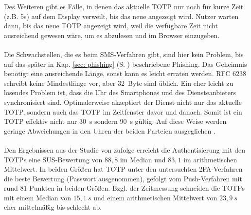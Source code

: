 Des Weiteren gibt es Fälle, in denen das aktuelle TOTP nur noch für kurze Zeit (z.B. 5s) auf dem Display 
verweilt, bis das neue angezeigt wird. Nutzer warten dann, bis das neue TOTP 
angezeigt wird, weil die verfügbare Zeit nicht ausreichend gewesen wäre, um es 
abzulesen und im Browser einzugeben.
\\\\
Die Schwachstellen, die es beim SMS-Verfahren gibt, sind hier kein Problem, bis auf 
das später in Kap. \ref{sec: phishing} (S. \pageref{sec: phishing}) beschriebene Phishing. Das Geheimnis benötigt eine ausreichende 
Länge, sonst kann es leicht erraten werden. RFC 6238 schreibt keine Mindestlänge 
vor, aber 32~Byte sind üblich. Ein eher leicht zu lösendes Problem ist, dass die Uhr 
des Smartphones und des Diensteanbieters synchronisiert sind. Optimalerweise akzeptiert der Dienst nicht nur das aktuelle TOTP, sondern auch das TOTP im Zeitfenster davor und danach. Somit ist ein TOTP effektiv nicht nur 30~s sondern 90~s gültig. Auf diese Weise werden geringe Abweichungen in den Uhren der beiden Parteien ausgeglichen \autocite[7]{rfc6238}.
\\\\
Den Ergebnissen aus der Studie von \textcite{Reese} zufolge erreicht die 
Authentisierung mit den TOTPs eine SUS-Bewertung von $88{,}8$ im Median und $83{,}1$ im 
arithmetischen Mittelwert. In beiden Größen hat TOTP unter den 
untersuchten 2FA-Verfahren die beste Bewertung (Passwort ausgenommen), gefolgt vom 
Push-Verfahren mit rund 81 Punkten in beiden Größen. Bzgl. der Zeitmessung schneiden 
die TOTPs mit einem Median von $15{,}1~s$ und einem arithmetischen Mittelwert von $23{,}9~s$ 
eher mittelmäßig bis schlecht ab.
